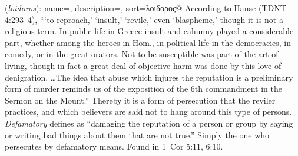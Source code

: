 \item[Defamatory,]

(\textit{loidoros}):
{
    name=,
    description={},
    sort=λοιδορος@
}
According to Hanse (TDNT 4:293--4), ```to reproach,' `insult,' `revile,' even `blaspheme,' though it is not a religious term. In public life in Greece insult and calumny played a considerable part, whether among the heroes in Hom., in political life in the democracies, in comedy, or in the great orators. Not to be susceptible was part of the art of living, though in fact a great deal of objective harm was done by this love of denigration. \ldots The idea that abuse which injures the reputation is a preliminary form of murder reminds us of the exposition of the 6th commandment in the Sermon on the Mount.'' Thereby it is a form of persecution that the reviler practices, and which believers are said not to hang around this type of persons. \emph{Defamatory} defines as ``damaging the reputation of a person or group by saying or writing bad things about them that are not true.'' Simply the one who persecutes by defamatory means.
Found in 1~Cor 5:11, 6:10.
